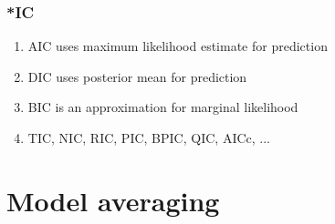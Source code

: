 \documentclass[10pt]{beamer}
\begin{document}
\begin{frame}{}

\frametitle{ *IC}

\begin{enumerate}
  \item AIC uses maximum likelihood estimate for prediction
  \item DIC uses posterior mean for prediction
  \item BIC is an approximation for marginal likelihood
  \item TIC, NIC, RIC, PIC, BPIC, QIC, AICc, ...
\end{enumerate}

\end{frame}


\section{Model averaging}
\frame{\sectionpage}









\end{document}
